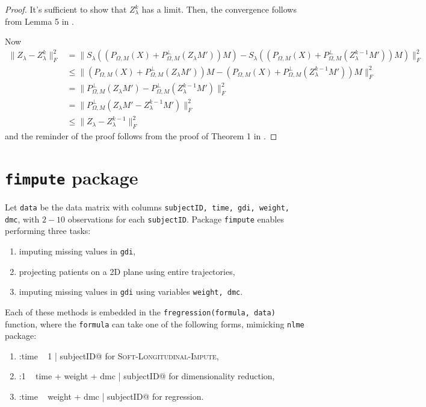 \documentclass[preprint]{imsart}
\numberwithin{equation}{section}
\theoremstyle{plain}
\begin{document}
\begin{proof}
It's sufficient to show that $Z_{\lambda}^k$ has a limit. Then, the convergence follows from Lemma 5 in \citep{mazumder2010spectral}.

Now
\begin{align*}
\|Z_\lambda - Z_\lambda^k\|_F^2 &= \|S_\lambda((P_{\Omega,M}(X) + P_{\Omega,M}^\perp(Z_\lambda M'))M) - S_\lambda((P_{\Omega,M}(X) + P_{\Omega,M}^\perp(Z_\lambda^{k-1}M'))M)\|_F^2 \\
&\leq \|(P_{\Omega,M}(X) + P_{\Omega,M}^\perp(Z_\lambda M'))M - (P_{\Omega,M}(X) + P_{\Omega,M}^\perp(Z_\lambda^{k-1}M'))M\|_F^2\\
&= \|P_{\Omega,M}^\perp(Z_\lambda M') - P_{\Omega,M}^\perp(Z_\lambda^{k-1}M')\|_F^2\\
&= \|P_{\Omega,M}^\perp(Z_\lambda M' - Z_\lambda^{k-1}M')\|_F^2\\
&\leq \|Z_\lambda - Z_\lambda^{k-1}\|_F^2
\end{align*}
and the reminder of the proof follows from the proof of Theorem 1 in \citep{mazumder2010spectral}.
\end{proof}

\section{\texttt{fimpute} package}

Let \verb|data| be the data matrix with columns \verb|subjectID, time, gdi, weight, dmc|, with $2-10$ observations for each \verb|subjectID|. Package \verb|fimpute| enables performing three tasks:
\begin{enumerate}
\item imputing missing values in \verb|gdi|,
\item projecting patients on a 2D plane using entire trajectories,
\item imputing missing values in \verb|gdi| using variables \verb|weight, dmc|.
\end{enumerate}
Each of these methods is embedded in the \verb|fregression(formula, data)| function, where the \verb|formula| can take one of the following forms, mimicking \verb|nlme| package:
\begin{enumerate}
\item \verb@gdi:time ~ 1 | subjectID@ for \textsc{Soft-Longitudinal-Impute},
\item \verb@gdi:1 ~ time + weight + dmc | subjectID@ for dimensionality reduction,
\item \verb@gdi:time ~ weight + dmc | subjectID@ for regression. 
\end{enumerate}
\end{document}
